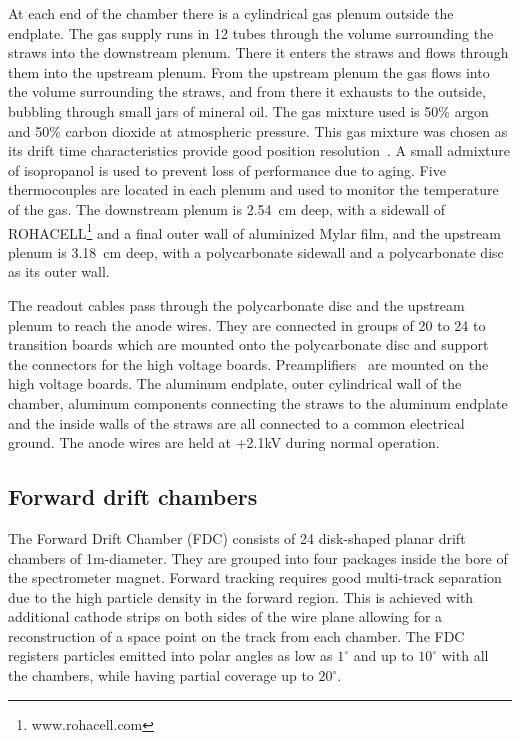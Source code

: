 At each end of the chamber there is a cylindrical gas plenum outside the endplate.  
The gas supply runs in 12 tubes through the volume surrounding the straws into the downstream plenum. 
There it enters the straws and flows through them into the upstream plenum. From the upstream plenum the gas flows into the volume surrounding the straws, and from there it exhausts to the outside, bubbling through small jars of mineral oil.
The gas mixture used is 50$\%$ argon and 50$\%$ carbon dioxide at atmospheric pressure. 
This gas mixture was chosen as its drift time characteristics provide good position resolution~\cite{VanHaarlem:2010yq}.
A small admixture of isopropanol is used to prevent loss of performance due to aging\cite{KADYK1991436,VAVRA20031}. 
Five thermocouples are located in each plenum and used to monitor the temperature of the gas.
The downstream plenum is 2.54~cm deep, with a sidewall of ROHACELL\footnote{www.rohacell.com} and a final outer wall of aluminized Mylar film, and the upstream plenum is 3.18~cm deep, with a polycarbonate sidewall and a polycarbonate disc as its outer wall. 

The readout cables pass through the polycarbonate disc and the upstream plenum to reach the anode wires. 
They are connected in groups of 20 to 24 to transition boards which are mounted onto the polycarbonate disc and support the connectors for the high voltage boards. 
Preamplifiers~\cite{hdnote2515} are mounted on the high voltage boards. The aluminum endplate, outer cylindrical wall of the chamber, aluminum components connecting the straws to the aluminum endplate and the inside walls of the straws are all connected to a common electrical ground. 
The anode wires are held at +2.1kV during normal operation. 


\subsection[Forward drift chambers]{Forward drift chambers
\label{sec:fdc} }

The Forward Drift Chamber (FDC) consists of 24 disk-shaped planar drift chambers of 1m-diameter.
They are grouped into four packages inside the bore of the spectrometer magnet.
Forward tracking requires good multi-track separation due to the
high particle density in the forward region.
This is achieved with additional cathode strips on both sides of the wire plane allowing for a  reconstruction of a space point on the track from each chamber. 
The FDC registers particles emitted into polar angles as low as $1^\circ$ and up to $10^\circ $
with all the chambers, while having partial coverage up to $20^\circ$.

